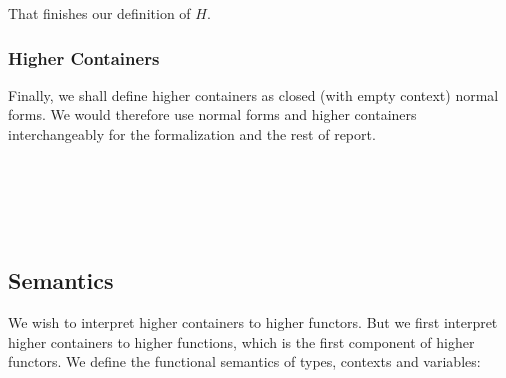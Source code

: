 That finishes our definition of $H$.

\subsubsection{Higher Containers}

Finally, we shall define higher containers as closed (with empty context) normal forms. We would therefore use normal forms and higher containers interchangeably for the formalization and the rest of report.

\begin{code}%
\>[0]\AgdaSpace{}%
\AgdaSymbol{:}\AgdaSpace{}%
\AgdaSpace{}%
\AgdaSpace{}%
\<%
\\
\>[0]\AgdaSpace{}%
\AgdaSpace{}%
\AgdaSymbol{=}\AgdaSpace{}%
\AgdaSpace{}%
\AgdaSpace{}%
\<%
\\
%
\\[\AgdaEmptyExtraSkip]%
\>[0]\AgdaSpace{}%
\AgdaSymbol{:}\AgdaSpace{}%
\AgdaSpace{}%
\AgdaSymbol{((}\AgdaInductiveConstructor{*}\AgdaSpace{}%
\AgdaSpace{}%
\AgdaInductiveConstructor{*}\AgdaSymbol{)}\AgdaSpace{}%
\AgdaSpace{}%
\AgdaInductiveConstructor{*}\AgdaSpace{}%
\AgdaSpace{}%
\AgdaInductiveConstructor{*}\AgdaSymbol{)}\<%
\\
\>[0]\AgdaSpace{}%
\AgdaSymbol{=}\AgdaSpace{}%
\<%
\end{code}

\subsection{Semantics}

We wish to interpret higher containers to higher functors. But we first interpret higher containers to higher functions, which is the first component of higher functors. We define the functional semantics of types, contexts and variables:

